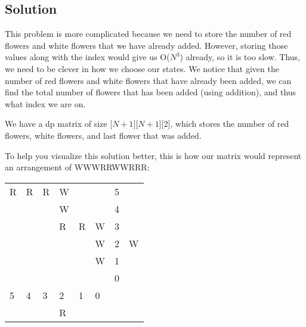 \documentclass{article}
\begin{document}
\subsection{Solution}
This problem is more complicated because we need to store the number of red flowers and white flowers that we have already added. However, storing those values along with the index would give us O($N^{3}$) already, so it is too slow. Thus, we need to be clever in how we choose our states. We notice that given the number of red flowers and white flowers that have already been added, we can find the total number of flowers that has been added (using addition), and thus what index we are on.

We have a dp matrix of size [$N+1$][$N+1$][2], which stores the number of red flowers, white flowers, and last flower that was added. 

To help you visualize this solution better, this is how our matrix would represent an arrangement of WWWRRWWRRR:

\begin{table}[h]
\begin{tabular}{llllllll}
\cline{1-6}
\multicolumn{1}{|l|}{R} & \multicolumn{1}{l|}{R} & \multicolumn{1}{l|}{R} & \multicolumn{1}{l|}{W} & \multicolumn{1}{l|}{}  & \multicolumn{1}{l|}{}  & 5 &   \\ \cline{1-6}
\multicolumn{1}{|l|}{}  & \multicolumn{1}{l|}{}  & \multicolumn{1}{l|}{}  & \multicolumn{1}{l|}{W} & \multicolumn{1}{l|}{}  & \multicolumn{1}{l|}{}  & 4 &   \\ \cline{1-6}
\multicolumn{1}{|l|}{}  & \multicolumn{1}{l|}{}  & \multicolumn{1}{l|}{}  & \multicolumn{1}{l|}{R} & \multicolumn{1}{l|}{R} & \multicolumn{1}{l|}{W} & 3 &   \\ \cline{1-6}
\multicolumn{1}{|l|}{}  & \multicolumn{1}{l|}{}  & \multicolumn{1}{l|}{}  & \multicolumn{1}{l|}{}  & \multicolumn{1}{l|}{}  & \multicolumn{1}{l|}{W} & 2 & W \\ \cline{1-6}
\multicolumn{1}{|l|}{}  & \multicolumn{1}{l|}{}  & \multicolumn{1}{l|}{}  & \multicolumn{1}{l|}{}  & \multicolumn{1}{l|}{}  & \multicolumn{1}{l|}{W} & 1 &   \\ \cline{1-6}
\multicolumn{1}{|l|}{}  & \multicolumn{1}{l|}{}  & \multicolumn{1}{l|}{}  & \multicolumn{1}{l|}{}  & \multicolumn{1}{l|}{}  & \multicolumn{1}{l|}{}  & 0 &   \\ \cline{1-6}
5                       & 4                      & 3                      & 2                      & 1                      & 0                      &   &   \\
                        &                        &                        & R                      &                        &                        &   &  
\end{tabular}
\end{table}
\end{document}
